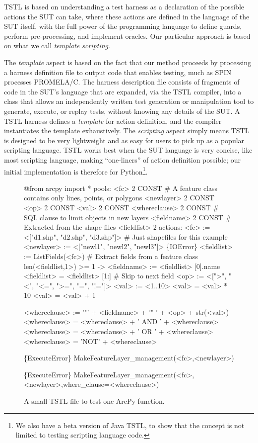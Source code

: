 TSTL is based on understanding a test harness as a declaration
  of the possible actions the SUT can take, where these actions are
defined in the language of the SUT itself, with the full power
of the programming language to define guards, perform
pre-processing, and implement oracles.  Our particular approach is
based on what we call \emph{template scripting}.

The \emph{template} aspect is based on the fact that our method
proceeds by processing a harness definition file to output code that
enables testing, much  as SPIN processes PROMELA/C.  The harness
description file consists of fragments of code in the SUT's language
that are expanded, via the TSTL compiler, into a class that allows
an independently written test generation or manipulation tool to
generate, execute, or replay tests, without knowing
any details of the SUT.
A TSTL harness defines a \emph{template} for action definition, and
the compiler 
instantiates the template exhaustively.  The \emph{scripting} aspect simply means
TSTL is designed to be very lightweight and as easy for
users to pick up as a popular scripting language.  TSTL
works best when the SUT language is very
concise, like most scripting language, making ``one-liners'' of action
definition possible; our initial implementation is therefore for
Python\footnote{We also have a beta version of Java TSTL, to show that
  the concept is not limited to testing scripting language code.}.

\begin{figure}
{\scriptsize
\begin{code}
@from arcpy import *
\vspace{0.1in}
pools:
  <fc> 2 CONST             \# A feature class contains only lines, points, or polygons
  <newlayer> 2 CONST
  <op> 2 CONST 
  <val> 2 CONST
  <whereclause> 2 CONST    \# SQL clause to limit objects in new layers
  <fieldname> 2 CONST      \# Extracted from the shape files
  <fieldlist> 2
\vspace{0.1in}
actions:
\vspace{0.1in}
<fc> := <["d1.shp", "d2.shp", "d3.shp"]>  \# Just shapefiles for this example
<newlayer> := <["newl1", "newl2", "newl3"]>
\vspace{0.05in}
\{IOError\} <fieldlist> := ListFields(<fc>) \# Extract fields from a feature class
len(<fieldlist,1>) >= 1 -> <fieldname> := <fieldlist> [0].name 
<fieldlist> = <fieldlist> [1:] \# Skip to next field
\vspace{0.05in}
<op> := <[">", "<", "<=", ">=", "=", "!="]>
<val> := <1..10>
<val> = <val> * 10
<val> = <val> + 1

<whereclause> := '"' + <fieldname> + '" ' + <op> + str(<val>)
<whereclause> = <whereclause> + ' AND ' + <whereclause>
<whereclause> = <whereclause> + ' OR ' +  <whereclause>
<whereclause> = 'NOT' + <whereclause>

\{ExecuteError\} MakeFeatureLayer\_management(<fc>,<newlayer>)

\{ExecuteError\} MakeFeatureLayer\_management(<fc>,<newlayer>,where\_clause=<whereclause>)
\end{code}
}
\caption{A small TSTL file to test one ArcPy function.}
\label{fig:makefeaturelayer}
\end{figure}

